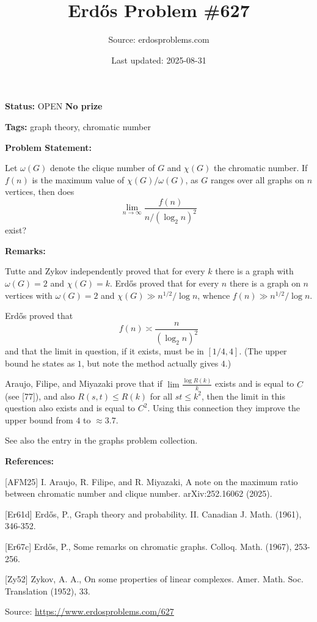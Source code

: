 \documentclass{article}
\title{Erd\H{o}s Problem \#627}
\date{Last updated: 2025-08-31}
\author{Source: erdosproblems.com}
\begin{document}
\maketitle

\noindent\textbf{Status:} OPEN \quad \textbf{No prize}

\noindent\textbf{Tags:} graph theory, chromatic number

\medskip
\noindent\textbf{Problem Statement:}

Let $\omega(G)$ denote the clique number of $G$ and $\chi(G)$ the chromatic number. If $f(n)$ is the maximum value of $\chi(G)/\omega(G)$, as $G$ ranges over all graphs on $n$ vertices, then does\[\lim_{n\to\infty}\frac{f(n)}{n/(\log_2n)^2}\]exist?

\bigskip
\noindent\textbf{Remarks:}

Tutte and Zykov \cite{Zy52} independently proved that for every $k$ there is a graph with $\omega(G)=2$ and $\chi(G)=k$. Erd\H{o}s \cite{Er61d} proved that for every $n$ there is a graph on $n$ vertices with $\omega(G)=2$ and $\chi(G)\gg n^{1/2}/\log n$, whence $f(n) \gg n^{1/2}/\log n$.

Erd\H{o}s \cite{Er67c} proved that\[f(n) \asymp \frac{n}{(\log_2n)^2}\]and that the limit in question, if it exists, must be in $[1/4,4]$. (The upper bound he states as $1$, but \cite{AFM25} note the method actually gives $4$.)

Araujo, Filipe, and Miyazaki \cite{AFM25} prove that if $\lim\frac{\log R(k)}{k}$ exists and is equal to $C$ (see [77]), and also $R(s,t)\leq R(k)$ for all $st\leq k^2$, then the limit in this question also exists and is equal to $C^2$. Using this connection they improve the upper bound from $4$ to $\approx 3.7$.

See also the entry in the graphs problem collection.

\bigskip
\noindent\textbf{References:}

[AFM25] I. Araujo, R. Filipe, and R. Miyazaki, A note on the maximum ratio between chromatic number and clique number. arXiv:252.16062 (2025).
 
 [Er61d] Erd\H{o}s, P., Graph theory and probability. II. Canadian J. Math. (1961), 346-352.
 
 [Er67c] Erd\H{o}s, P., Some remarks on chromatic graphs. Colloq. Math. (1967), 253-256.
 
 [Zy52] Zykov, A. A., On some properties of linear complexes. Amer. Math. Soc. Translation (1952), 33.

\bigskip
\noindent\small{Source: \url{https://www.erdosproblems.com/627}}
\end{document}
